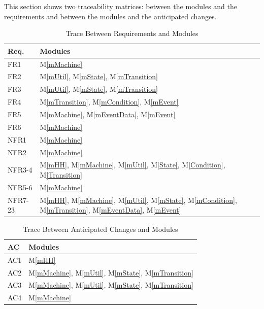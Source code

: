 \documentclass[12pt, titlepage]{article}
\newcommand{\mref}[1]{M\ref{#1}}
\begin{document}
This section shows two traceability matrices: between the modules and the
requirements and between the modules and the anticipated changes.

\begin{table}[H]
\centering
\begin{tabular}{p{} p{}}
\toprule
\textbf{Req.} & \textbf{Modules}\\
\midrule
FR1 & \mref{mMachine}\\
FR2 & \mref{mUtil}, \mref{mState}, \mref{mTransition}\\
FR3 & \mref{mUtil}, \mref{mState}, \mref{mTransition}\\
FR4 & \mref{mTransition}, \mref{mCondition}, \mref{mEvent}\\
FR5 & \mref{mMachine}, \mref{mEventData}, \mref{mEvent}\\
FR6 & \mref{mMachine}\\
NFR1 & \mref{mMachine}\\
NFR2 & \mref{mMachine}\\
NFR3-4 & \mref{mHH}, \mref{mMachine}, \mref{mUtil}, \mref{State}, \mref{Condition}, \mref{Transition}\\
NFR5-6& \mref{mMachine}\\
NFR7-23& \mref{mHH}, \mref{mMachine}, \mref{mUtil}, \mref{mState}, \mref{mCondition}, \mref{mTransition}, \mref{mEventData}, \mref{mEvent}\\
\bottomrule
\end{tabular}
\caption{Trace Between Requirements and Modules}
\label{TblRT}
\end{table}

\begin{table}[H]
\centering
\begin{tabular}{p{} p{}}
\toprule
\textbf{AC} & \textbf{Modules}\\
\midrule
AC1 & \mref{mHH}\\
AC2 & \mref{mMachine}, \mref{mUtil}, \mref{mState}, \mref{mTransition}\\
AC3 & \mref{mMachine},  \mref{mUtil}, \mref{mState}, \mref{mTransition}\\
AC4 & \mref{mMachine}\\
\bottomrule
\end{tabular}
\caption{Trace Between Anticipated Changes and Modules}
\label{TblACT}
\end{table}
\end{document}
